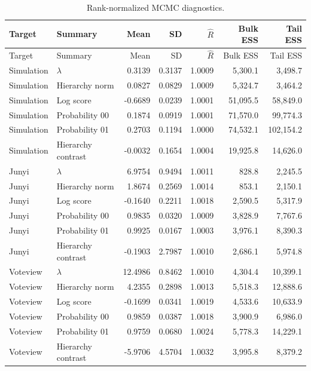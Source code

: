 \documentclass[
  12pt]{article}
\theoremstyle{definition}
\theoremstyle{plain}
\begin{document}
\clearpage
\begingroup
\small
\setlength{\tabcolsep}{4pt}
\begin{longtable}{@{}l@{\hspace{1em}}lrrrrr@{}}
\caption{Rank-normalized MCMC diagnostics.}\label{tab:mcmc-diagnostics}\\
\toprule
Target & Summary & Mean & SD & $\widehat R$ & Bulk ESS & Tail ESS \\
\midrule
\endfirsthead
\toprule
Target & Summary & Mean & SD & $\widehat R$ & Bulk ESS & Tail ESS \\
\midrule
\endhead
Simulation & $\lambda$ & 0.3139 & 0.3137 & 1.0009 & 5,300.1 & 3,498.7 \\
Simulation & Hierarchy norm & 0.0827 & 0.0829 & 1.0009 & 5,324.7 & 3,464.2 \\
Simulation & Log score & -0.6689 & 0.0239 & 1.0001 & 51,095.5 & 58,849.0 \\
Simulation & Probability 00 & 0.1874 & 0.0919 & 1.0001 & 71,570.0 & 99,774.3 \\
Simulation & Probability 01 & 0.2703 & 0.1194 & 1.0000 & 74,532.1 & 102,154.2 \\
Simulation & Hierarchy contrast & -0.0032 & 0.1654 & 1.0004 & 19,925.8 & 14,626.0 \\
\addlinespace
Junyi & $\lambda$ & 6.9754 & 0.9494 & 1.0011 & 828.8 & 2,245.5 \\
Junyi & Hierarchy norm & 1.8674 & 0.2569 & 1.0014 & 853.1 & 2,150.1 \\
Junyi & Log score & -0.1640 & 0.2211 & 1.0018 & 2,590.5 & 5,317.9 \\
Junyi & Probability 00 & 0.9835 & 0.0320 & 1.0009 & 3,828.9 & 7,767.6 \\
Junyi & Probability 01 & 0.9925 & 0.0167 & 1.0003 & 3,976.1 & 8,390.3 \\
Junyi & Hierarchy contrast & -0.1903 & 2.7987 & 1.0010 & 2,686.1 & 5,974.8 \\
\addlinespace
Voteview & $\lambda$ & 12.4986 & 0.8462 & 1.0010 & 4,304.4 & 10,399.1 \\
Voteview & Hierarchy norm & 4.2355 & 0.2898 & 1.0013 & 5,518.3 & 12,888.6 \\
Voteview & Log score & -0.1699 & 0.0341 & 1.0019 & 4,533.6 & 10,633.9 \\
Voteview & Probability 00 & 0.9859 & 0.0387 & 1.0018 & 3,900.9 & 6,986.0 \\
Voteview & Probability 01 & 0.9759 & 0.0680 & 1.0024 & 5,778.3 & 14,229.1 \\
Voteview & Hierarchy contrast & -5.9706 & 4.5704 & 1.0032 & 3,995.8 & 8,379.2 \\
\bottomrule
\end{longtable}
\end{document}

